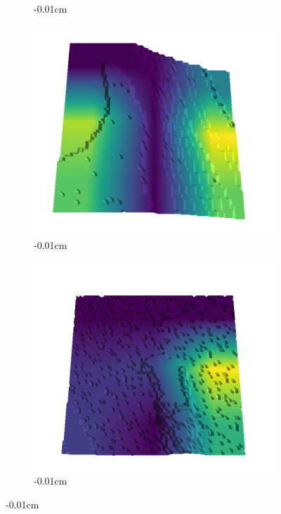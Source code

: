 \documentclass[../document.tex]{subfiles}
\begin{document}
\begin{figure}[H]
\begin{subfigure}[b]{0.242\linewidth}
    \caption{-0.01cm}
    \end{subfigure}
    \begin{subfigure}[b]{0.242\linewidth}
    \includegraphics[width=\linewidth]{../img/5/quarry/worst/15-patch-3d-majavi-colormap-90.png}
    \caption{-0.01cm}
    \end{subfigure}
    \begin{subfigure}[b]{0.242\linewidth}
    \includegraphics[width=\linewidth]{../img/5/quarry/worst/18-patch-3d-majavi-colormap-95.png}
    \caption{-0.01cm}
    \end{subfigure}
    \end{figure}
\end{document}
